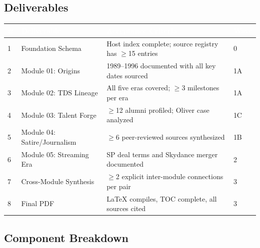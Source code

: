 \documentclass[11pt,letterpaper]{article}
\newcommand{\tableheader}[1]{\textbf{\sffamily\textcolor{white}{#1}}}
\begin{document}
\subsection{Deliverables}

\begin{center}
\begin{tabularx}{\textwidth}{C{0.5cm}L{4cm}XC{2cm}}
\toprule
{}
\tableheader{\#} & \tableheader{Deliverable} & \tableheader{Acceptance Criteria} & \tableheader{Wave} \\
 & Foundation Schema & Host index complete; source registry has $\geq$15 entries & 0 \\
2 & Module 01: Origins & 1989--1996 documented with all key dates sourced & 1A \\
3 & Module 02: TDS Lineage & All five eras covered; $\geq$3 milestones per era & 1A \\
4 & Module 03: Talent Forge & $\geq$12 alumni profiled; Oliver case analyzed & 1C \\
5 & Module 04: Satire/Journalism & $\geq$6 peer-reviewed sources synthesized & 1B \\
6 & Module 05: Streaming Era & SP deal terms and Skydance merger documented & 2 \\
7 & Cross-Module Synthesis & $\geq$2 explicit inter-module connections per pair & 3 \\
8 & Final PDF & LaTeX compiles, TOC complete, all sources cited & 3 \\
\bottomrule
\end{tabularx}
\end{center}

\subsection{Component Breakdown}
\end{document}

